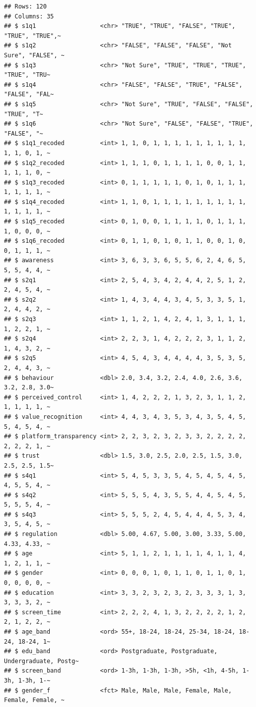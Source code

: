 \documentclass[
]{article}
\begin{document}
\begin{verbatim}
## Rows: 120
## Columns: 35
## $ s1q1                  <chr> "TRUE", "TRUE", "FALSE", "TRUE", "TRUE", "TRUE",~
## $ s1q2                  <chr> "FALSE", "FALSE", "FALSE", "Not Sure", "FALSE", ~
## $ s1q3                  <chr> "Not Sure", "TRUE", "TRUE", "TRUE", "TRUE", "TRU~
## $ s1q4                  <chr> "FALSE", "FALSE", "TRUE", "FALSE", "FALSE", "FAL~
## $ s1q5                  <chr> "Not Sure", "TRUE", "FALSE", "FALSE", "TRUE", "T~
## $ s1q6                  <chr> "Not Sure", "FALSE", "FALSE", "TRUE", "FALSE", "~
## $ s1q1_recoded          <int> 1, 1, 0, 1, 1, 1, 1, 1, 1, 1, 1, 1, 1, 1, 0, 1, ~
## $ s1q2_recoded          <int> 1, 1, 1, 0, 1, 1, 1, 1, 0, 0, 1, 1, 1, 1, 1, 0, ~
## $ s1q3_recoded          <int> 0, 1, 1, 1, 1, 1, 0, 1, 0, 1, 1, 1, 1, 1, 1, 1, ~
## $ s1q4_recoded          <int> 1, 1, 0, 1, 1, 1, 1, 1, 1, 1, 1, 1, 1, 1, 1, 1, ~
## $ s1q5_recoded          <int> 0, 1, 0, 0, 1, 1, 1, 1, 0, 1, 1, 1, 1, 0, 0, 0, ~
## $ s1q6_recoded          <int> 0, 1, 1, 0, 1, 0, 1, 1, 0, 0, 1, 0, 0, 1, 1, 1, ~
## $ awareness             <int> 3, 6, 3, 3, 6, 5, 5, 6, 2, 4, 6, 5, 5, 5, 4, 4, ~
## $ s2q1                  <int> 2, 5, 4, 3, 4, 2, 4, 4, 2, 5, 1, 2, 2, 4, 5, 4, ~
## $ s2q2                  <int> 1, 4, 3, 4, 4, 3, 4, 5, 3, 3, 5, 1, 2, 4, 4, 2, ~
## $ s2q3                  <int> 1, 1, 2, 1, 4, 2, 4, 1, 3, 1, 1, 1, 1, 2, 2, 1, ~
## $ s2q4                  <int> 2, 2, 3, 1, 4, 2, 2, 2, 3, 1, 1, 2, 1, 4, 3, 2, ~
## $ s2q5                  <int> 4, 5, 4, 3, 4, 4, 4, 4, 3, 5, 3, 5, 2, 4, 4, 3, ~
## $ behaviour             <dbl> 2.0, 3.4, 3.2, 2.4, 4.0, 2.6, 3.6, 3.2, 2.8, 3.0~
## $ perceived_control     <int> 1, 4, 2, 2, 2, 1, 3, 2, 3, 1, 1, 2, 1, 1, 1, 1, ~
## $ value_recognition     <int> 4, 4, 3, 4, 3, 5, 3, 4, 3, 5, 4, 5, 5, 4, 5, 4, ~
## $ platform_transparency <int> 2, 2, 3, 2, 3, 2, 3, 3, 2, 2, 2, 2, 2, 2, 2, 1, ~
## $ trust                 <dbl> 1.5, 3.0, 2.5, 2.0, 2.5, 1.5, 3.0, 2.5, 2.5, 1.5~
## $ s4q1                  <int> 5, 4, 5, 3, 3, 5, 4, 5, 4, 5, 4, 5, 4, 5, 5, 4, ~
## $ s4q2                  <int> 5, 5, 5, 4, 3, 5, 5, 4, 4, 5, 4, 5, 5, 5, 5, 4, ~
## $ s4q3                  <int> 5, 5, 5, 2, 4, 5, 4, 4, 4, 5, 3, 4, 3, 5, 4, 5, ~
## $ regulation            <dbl> 5.00, 4.67, 5.00, 3.00, 3.33, 5.00, 4.33, 4.33, ~
## $ age                   <int> 5, 1, 1, 2, 1, 1, 1, 1, 4, 1, 1, 4, 1, 2, 1, 1, ~
## $ gender                <int> 0, 0, 0, 1, 0, 1, 1, 0, 1, 1, 0, 1, 0, 0, 0, 0, ~
## $ education             <int> 3, 3, 2, 3, 2, 3, 2, 3, 3, 3, 1, 3, 3, 3, 3, 2, ~
## $ screen_time           <int> 2, 2, 2, 4, 1, 3, 2, 2, 2, 2, 1, 2, 2, 1, 2, 2, ~
## $ age_band              <ord> 55+, 18-24, 18-24, 25-34, 18-24, 18-24, 18-24, 1~
## $ edu_band              <ord> Postgraduate, Postgraduate, Undergraduate, Postg~
## $ screen_band           <ord> 1-3h, 1-3h, 1-3h, >5h, <1h, 4-5h, 1-3h, 1-3h, 1-~
## $ gender_f              <fct> Male, Male, Male, Female, Male, Female, Female, ~
\end{verbatim}
\end{document}
